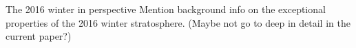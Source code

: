 The 2016 winter in perspective
Mention background info on the exceptional properties of the 2016 winter stratosphere. (Maybe not go to deep in detail in the current paper?)